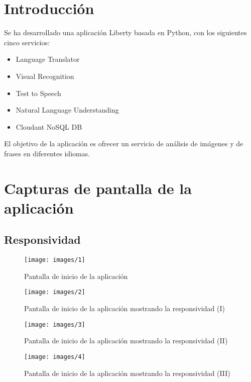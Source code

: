 \section{Introducción} %
\label{sec:introducción}
	Se ha desarrollado una aplicación Liberty basada en Python, con los siguientes cinco servicios:
	\begin{itemize}
		\item Language Translator
		\item Visual Recognition
		\item Test to Speech
		\item Natural Language Understanding
		\item Cloudant NoSQL DB
	\end{itemize}
	El objetivo de la aplicación es ofrecer un servicio de análisis de imágenes y de frases en diferentes idiomas.


\section{Capturas de pantalla de la aplicación} %
\label{sec:capturas_de_pantalla_de_la_aplicación}
\newpage
\clearpage
\subsection{Responsividad} %
\label{sub:responsividad}

\begin{figure}[htp!]
    \centering
    \texttt{[image: images/1]}
    \caption{Pantalla de inicio de la aplicación}
    \label{fig:1}
\end{figure}
\begin{figure}[htp!]
    \centering
    \texttt{[image: images/2]}
    \caption{Pantalla de inicio de la aplicación mostrando la responsividad (I)}
    \label{fig:2}
\end{figure}
\begin{figure}[htp!]
    \centering
    \texttt{[image: images/3]}
    \caption{Pantalla de inicio de la aplicación mostrando la responsividad (II)}
    \label{fig:3}
\end{figure}
\begin{figure}[htp!]
    \centering
    \texttt{[image: images/4]}
    \caption{Pantalla de inicio de la aplicación mostrando la responsividad (III)}
    \label{fig:4}
\end{figure}
\newpage
\clearpage
